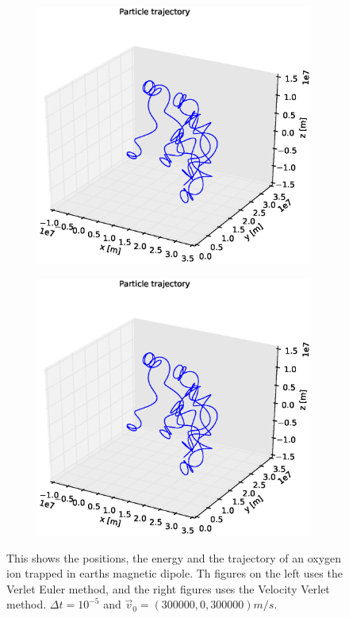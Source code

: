 \documentclass[x11names]{article}
\renewcommand{\va}{\vec}
\begin{document}
\begin{figure}
\begin{subfigure}{0.45\textwidth}
        \includegraphics[width = \textwidth]{../source/figures/ion_8_5_Euler3Dplot}
      \end{subfigure}
      \begin{subfigure}{0.45\textwidth}
        \includegraphics[width = \textwidth]{../source/figures/ion_8_5_Verlet3Dplot}
      \end{subfigure}
    \caption{This shows the positions, the energy and the trajectory of an oxygen ion trapped in earths magnetic dipole. Th figures on the left uses the Verlet Euler method, and the right figures uses the Velocity Verlet method. \(\Delta t = 10^{-5}\) and \(\va{v}_0 = (300000, 0 , 300000) m/s \).}
    \label{fig:high_vel}
    \end{figure}
\end{document}
